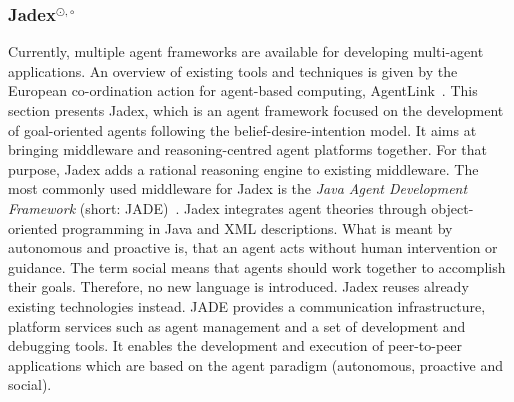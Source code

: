 \subsubsection[Jadex]{Jadex$^{\odot,\circ}$}\label{fun:apl_jadex}
Currently, multiple agent frameworks are available for developing multi-agent applications.
An overview of existing tools and techniques is given by the European co-ordination action for agent-based computing, AgentLink~\cite{Mangina}. %
This section presents Jadex, which is an agent framework focused on the development of goal-oriented agents following the belief-desire-intention model.
It aims at bringing middleware and reasoning-centred agent platforms together.
For that purpose, Jadex adds a rational reasoning engine to existing middleware.
The most commonly used middleware for Jadex is the \emph{Java Agent Development Framework} (short: JADE)~\cite{bellifemine_jade_2005}. %
Jadex integrates agent theories through object-oriented programming in Java and XML descriptions. What is meant by autonomous and proactive is, that an agent acts without human intervention or guidance. The term social means that agents should work together to accomplish their goals.
Therefore, no new language is introduced.
Jadex reuses already existing technologies instead.
JADE provides a communication infrastructure, platform services such as agent management and a set of development and debugging tools.
It enables the development and execution of peer-to-peer applications which are based on the agent paradigm (autonomous, proactive and social). %

